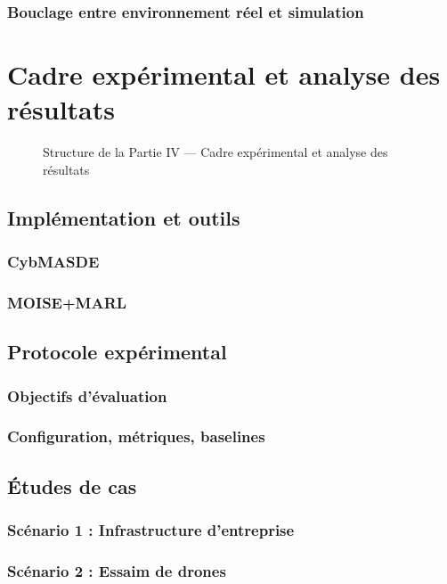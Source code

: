 \documentclass[ twoside,openright,titlepage,numbers=noenddot,headinclude,%
                footinclude=true,cleardoublepage=empty,abstractoff, %
                BCOR=5mm,paper=a4,fontsize=11pt,%
                french,american,%
                ]{scrreprt}
\begin{document}
\section{Bouclage entre environnement réel et simulation}

\part{Cadre expérimental et analyse des résultats}

\begin{figure}[h!]
\centering

\caption{Structure de la Partie IV — Cadre expérimental et analyse des résultats}
\end{figure}

\chapter{Implémentation et outils}
\section{CybMASDE}
\section{MOISE+MARL}

\chapter{Protocole expérimental}
\section{Objectifs d’évaluation}
\section{Configuration, métriques, baselines}

\chapter{Études de cas}
\section{Scénario 1 : Infrastructure d’entreprise}
\section{Scénario 2 : Essaim de drones}
\end{document}
